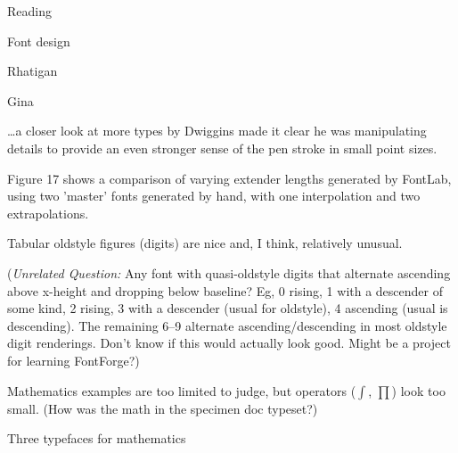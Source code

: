 \documentclass[12pt]{PalisadesLakesBook}
\begin{document}
\begin{plSection}{Reading}
\begin{plSection}{Font design}
\begin{plSection}{Rhatigan}
\begin{plSection}{Gina}
\begin{plSection}{}
\begin{plQuote}{}{}
\ldots a closer look at more types 
by Dwiggins made it clear he was manipulating details to provide 
an even stronger sense of the pen stroke in small point sizes.
\end{plQuote}

Figure 17 shows a comparison of varying extender lengths
generated by FontLab, using two 'master' fonts generated by hand,
with one interpolation and two extrapolations.


\end{plSection}%
\begin{plSection}{}

Tabular oldstyle figures (digits) are nice and, I think,
relatively unusual.

(\emph{Unrelated Question:} 
Any font with quasi-oldstyle digits that alternate 
ascending above x-height and dropping below baseline?
Eg, 0 rising, 1 with a descender of some kind, 2 rising, 3 with
a descender (usual for oldstyle), 4 ascending (usual is descending).
The remaining 6--9 alternate ascending/descending in most
oldstyle digit renderings.
Don't know if this would actually look good.
Might be a project for learning FontForge?)

Mathematics examples are too limited to judge, 
but operators ($\int$, $\prod$) look too small. 
(How was the math in the specimen doc typeset?)

\end{plSection}%
\end{plSection}%
\begin{plSection}{Three typefaces for mathematics}


\end{plSection}%
\end{plSection}%
\end{plSection}%
\end{plSection}%
\end{document}
